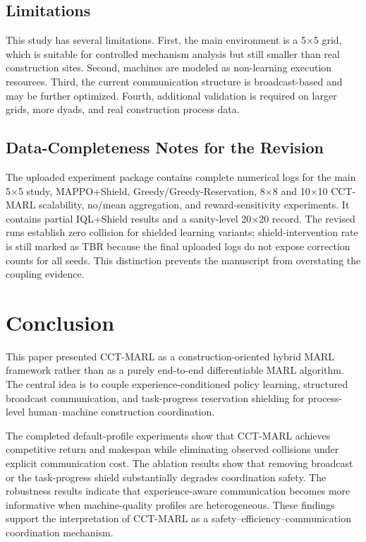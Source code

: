 \documentclass[preprint,12pt]{elsarticle}
\begin{document}
\subsection{Limitations}

This study has several limitations. First, the main environment is a 5$\times$5 grid, which is suitable for controlled mechanism analysis but still smaller than real construction sites. Second, machines are modeled as non-learning execution resources. Third, the current communication structure is broadcast-based and may be further optimized. Fourth, additional validation is required on larger grids, more dyads, and real construction process data.


\subsection{Data-Completeness Notes for the Revision}
The uploaded experiment package contains complete numerical logs for the main 5$\times$5 study, MAPPO+Shield, Greedy/Greedy-Reservation, 8$\times$8 and 10$\times$10 CCT-MARL scalability, no/mean aggregation, and reward-sensitivity experiments. It contains partial IQL+Shield results and a sanity-level 20$\times$20 record. The revised runs establish zero collision for shielded learning variants; shield-intervention rate is still marked as TBR because the final uploaded logs do not expose correction counts for all seeds. This distinction prevents the manuscript from overstating the coupling evidence.

\section{Conclusion}

This paper presented CCT-MARL as a construction-oriented hybrid MARL framework rather than as a purely end-to-end differentiable MARL algorithm. The central idea is to couple experience-conditioned policy learning, structured broadcast communication, and task-progress reservation shielding for process-level human--machine construction coordination.

The completed default-profile experiments show that CCT-MARL achieves competitive return and makespan while eliminating observed collisions under explicit communication cost. The ablation results show that removing broadcast or the task-progress shield substantially degrades coordination safety. The robustness results indicate that experience-aware communication becomes more informative when machine-quality profiles are heterogeneous. These findings support the interpretation of CCT-MARL as a safety--efficiency--communication coordination mechanism.
\end{document}
